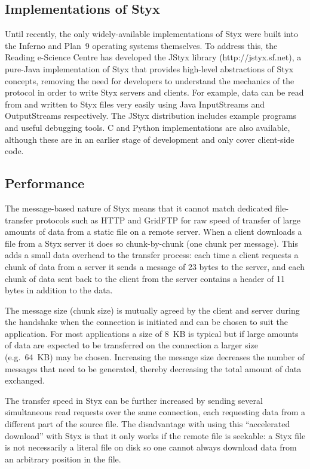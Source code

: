 \documentclass[a4paper]{article}
\begin{document}
\begin{multicols}{2}
\subsection{Implementations of Styx}
Until recently, the only widely-available implementations of Styx were built into the Inferno and Plan~9 operating systems themselves.  To address this, the Reading e-Science Centre has developed the JStyx library (http://jstyx.sf.net), a pure-Java implementation of Styx that provides high-level abstractions of Styx concepts, removing the need for developers to understand the mechanics of the protocol in order to write Styx servers and clients.  For example, data can be read from and written to Styx files very easily using Java InputStreams and OutputStreams respectively.  The JStyx distribution includes example programs and useful debugging tools.  C and Python implementations are also available, although these are in an earlier stage of development and only cover client-side code.

\subsection{Performance}
The message-based nature of Styx means that it cannot match dedicated file-transfer protocols such as HTTP and GridFTP for raw speed of transfer of large amounts of data from a static file on a remote server.  When a client downloads a file from a Styx server it does so chunk-by-chunk (one chunk per message).  This adds a small data overhead to the transfer process: each time a client requests a chunk of data from a server it sends a message of 23 bytes to the server, and each chunk of data sent back to the client from the server contains a header of 11 bytes in addition to the data.

The message size (chunk size) is mutually agreed by the client and server during the handshake when the connection is initiated and can be chosen to suit the application.  For most applications a size of 8~KB is typical but if large amounts of data are expected to be transferred on the connection a larger size (e.g.\ 64~KB) may be chosen.  Increasing the message size decreases the number of messages that need to be generated, thereby decreasing the total amount of data exchanged.

The transfer speed in Styx can be further increased by sending several simultaneous read requests over the same connection, each requesting data from a different part of the source file.  The disadvantage with using this ``accelerated download'' with Styx is that it only works if the remote file is seekable: a Styx file is not necessarily a literal file on disk so one cannot always download data from an arbitrary position in the file.


\end{multicols}
\end{document}
